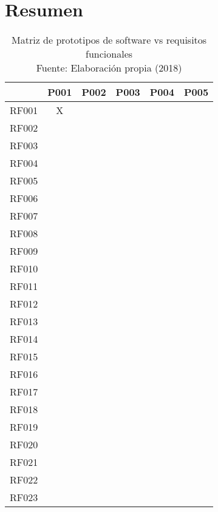 \section{Resumen}



\begin{table}[]
\centering
\captionsetup{justification=centering}
\caption[Matriz de prototipos de software vs requisitos funcionales]{Matriz de prototipos de software vs requisitos funcionales \\ Fuente: Elaboración propia (2018)}
\label{table:RF-summary}
\begin{tabular}{|c|c|c|c|c|c|}
\hline
 & P001 & P002 & P003 & P004 & P005 \\ \hline
RF001 & X &  &  &  &  \\ \hline
RF002 &  &  &  &  &  \\ \hline
RF003 &  &  &  &  &  \\ \hline
RF004 &  &  &  &  &  \\ \hline
RF005 &  &  &  &  &  \\ \hline
RF006 &  &  &  &  &  \\ \hline
RF007 &  &  &  &  &  \\ \hline
RF008 &  &  &  &  &  \\ \hline
RF009 &  &  &  &  &  \\ \hline
RF010 &  &  &  &  &  \\ \hline
RF011 &  &  &  &  &  \\ \hline
RF012 &  &  &  &  &  \\ \hline
RF013 &  &  &  &  &  \\ \hline
RF014 &  &  &  &  &  \\ \hline
RF015 &  &  &  &  &  \\ \hline
RF016 &  &  &  &  &  \\ \hline
RF017 &  &  &  &  &  \\ \hline
RF018 &  &  &  &  &  \\ \hline
RF019 &  &  &  &  &  \\ \hline
RF020 &  &  &  &  &  \\ \hline
RF021 &  &  &  &  &  \\ \hline
RF022 &  &  &  &  &  \\ \hline
RF023 &  &  &  &  &  \\ \hline
\end{tabular}
\end{table}